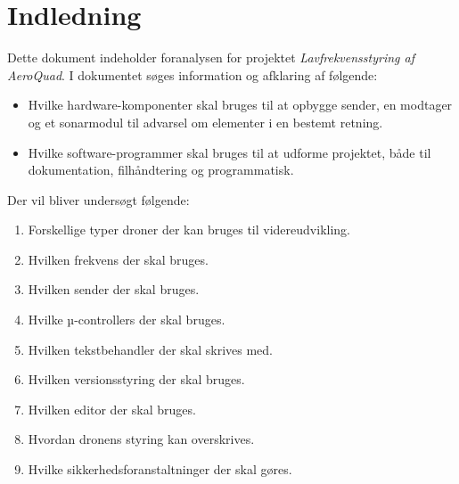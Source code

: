 \documentclass[Main]{subfiles}
\begin{document}
\chapter{Indledning}

Dette dokument indeholder foranalysen for projektet \textit{Lavfrekvensstyring af AeroQuad}.
I dokumentet søges information og afklaring af følgende:
\begin{itemize}
\item Hvilke hardware-komponenter skal bruges til at opbygge sender, en modtager og et sonarmodul til advarsel om elementer i en bestemt retning.
\item Hvilke software-programmer skal bruges til at udforme projektet, både til dokumentation, filhåndtering og programmatisk.
\end{itemize}

Der vil bliver undersøgt følgende:
\begin{enumerate}[label=P\arabic{enumi}.]
\item Forskellige typer droner der kan bruges til videreudvikling.
\item Hvilken frekvens der skal bruges.
\item Hvilken sender der skal bruges.
\item Hvilke µ-controllers der skal bruges.
\item Hvilken tekstbehandler der skal skrives med.
\item Hvilken versionsstyring der skal bruges.
\item Hvilken editor der skal bruges.
\item Hvordan dronens styring kan overskrives.
\item Hvilke sikkerhedsforanstaltninger der skal gøres.
\end{enumerate}
\end{document}
